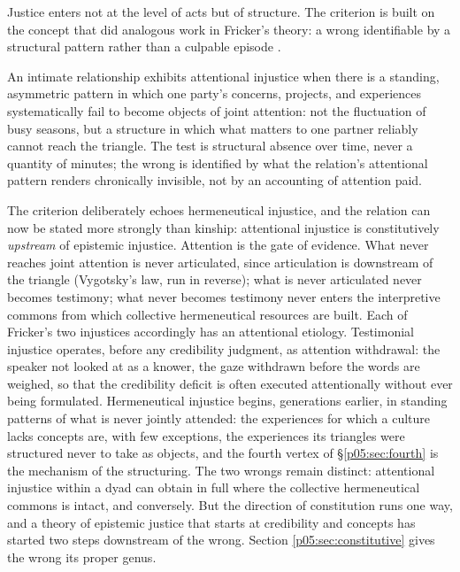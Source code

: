 Justice enters not at the level of acts but of structure. The criterion is built on the concept that did analogous work in Fricker's theory: a wrong identifiable by a structural pattern rather than a culpable episode \parencite{fricker2007}.

\begin{crit}\label{p05:crit:attention}
An intimate relationship exhibits attentional injustice when there is a standing, asymmetric pattern in which one party's concerns, projects, and experiences systematically fail to become objects of joint attention: not the fluctuation of busy seasons, but a structure in which what matters to one partner reliably cannot reach the triangle. The test is structural absence over time, never a quantity of minutes; the wrong is identified by what the relation's attentional pattern renders chronically invisible, not by an accounting of attention paid.
\end{crit}

The criterion deliberately echoes hermeneutical injustice, and the relation can now be stated more strongly than kinship: attentional injustice is constitutively \emph{upstream} of epistemic injustice. Attention is the gate of evidence. What never reaches joint attention is never articulated, since articulation is downstream of the triangle (Vygotsky's law, run in reverse); what is never articulated never becomes testimony; what never becomes testimony never enters the interpretive commons from which collective hermeneutical resources are built. Each of Fricker's two injustices accordingly has an attentional etiology. Testimonial injustice operates, before any credibility judgment, as attention withdrawal: the speaker not looked at as a knower, the gaze withdrawn before the words are weighed, so that the credibility deficit is often executed attentionally without ever being formulated. Hermeneutical injustice begins, generations earlier, in standing patterns of what is never jointly attended: the experiences for which a culture lacks concepts are, with few exceptions, the experiences its triangles were structured never to take as objects, and the fourth vertex of §\ref{p05:sec:fourth} is the mechanism of the structuring. The two wrongs remain distinct: attentional injustice within a dyad can obtain in full where the collective hermeneutical commons is intact, and conversely. But the direction of constitution runs one way, and a theory of epistemic justice that starts at credibility and concepts has started two steps downstream of the wrong. Section \ref{p05:sec:constitutive} gives the wrong its proper genus.

